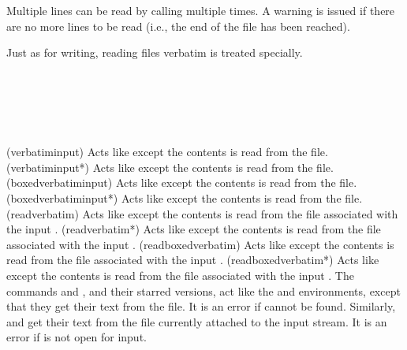 {{{{Multiple lines can be read by calling \cmd{\readaline} multiple times.
A warning is issued if there are no more lines to be read (i.e., the
end of the file has been reached).

Just as for writing, reading files 
verbatim is treated specially.
\begin{syntax}
\cmd{} \cmd{} \\
\cmd{\boxedverbatiminput} \cmd{\boxedverbatiminput*} \\
\cmd{\readverbatim} \cmd{\readverbatim*} \\
\cmd{\readboxedverbatim} \cmd{\readboxedverbatim*} \\
\end{syntax}
\glossary(verbatiminput)%
  {}%
  {Acts like  except the contents is read from the  file.}
\glossary(verbatiminput*)%
  {}%
  {Acts like  except the contents is read from the  file.}
\glossary(boxedverbatiminput)%
  {}%
  {Acts like  except the contents is read from the  file.}
\glossary(boxedverbatiminput*)%
  {}%
  {Acts like  except the contents is read from the  file.}
\glossary(readverbatim)%
  {}%
  {Acts like  except the contents is read from the file 
   associated with the input .}
\glossary(readverbatim*)%
  {}%
  {Acts like  except the contents is read from the file 
   associated with the input .}
\glossary(readboxedverbatim)%
  {}%
  {Acts like  except the contents is read from the file 
   associated with the input .}
\glossary(readboxedverbatim*)%
  {}%
  {Acts like  except the contents is read from the file 
   associated with the input .}
The commands \cmd{} and 
\cmd{\boxedverbatiminput}, 
 and their
starred versions, act like the  and 
environments, except that they get their text from the  file.
It is an error if  cannot be found.
Similarly, \cmd{\readverbatim} and \cmd{\readboxedverbatim} get their
text from the file currently attached to the  input stream.
It is an error if  is not open for input.

}}}}
